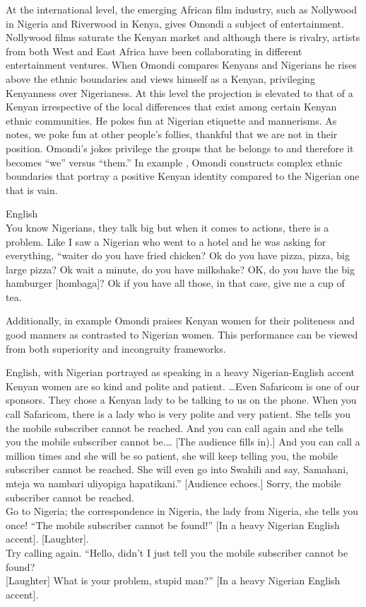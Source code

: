 \documentclass[output=paper]{langsci/langscibook}
\begin{document}
At the international level, the emerging African film industry, such as Nollywood in Nigeria and Riverwood in Kenya, gives Omondi a subject of entertainment. Nollywood films saturate the Kenyan market and although there is rivalry, artists from both West and East Africa have been collaborating in different entertainment ventures. When Omondi compares Kenyans and Nigerians he rises above the ethnic boundaries and views himself as a Kenyan, privileging Kenyanness over Nigerianess. At this level the projection is elevated to that of a Kenyan irrespective of the local differences that exist among certain Kenyan ethnic communities. He pokes fun at Nigerian etiquette and mannerisms. As \citet{Labrador2004} notes, we poke fun at other people’s follies, thankful that we are not in their position. Omondi’s jokes privilege the groups that he belongs to and therefore it becomes “we” versus “them.” In example , Omondi constructs complex ethnic boundaries that portray a positive Kenyan identity compared to the Nigerian one that is vain.

\ea\label{ex:muaka:4}
{English }\\
  You know Nigerians, they talk big but when it comes to actions, there is a problem. Like I saw a Nigerian who went to a hotel and he was asking for everything, “waiter do you have fried chicken? Ok do you have pizza, pizza, big large pizza? Ok wait a minute, do you have milkshake? OK, do you have the big hamburger \textup{[hombaga]}? Ok if you have all those, in that case, give me a cup of tea.   \citep{Omogi2012}
\z

Additionally, in example  Omondi praises Kenyan women for their politeness and good manners as contrasted to Nigerian women. This performance can be viewed from both superiority and incongruity frameworks.

\ea\label{ex:muaka:5}
{English, with Nigerian portrayed as speaking in a heavy Nigerian-English accent}\\
Kenyan women are so kind and polite and patient. …Even Safaricom is one of our sponsors. They chose a Kenyan lady to be talking to us on the phone. When you call Safaricom, there is a lady who is very polite and very patient. She tells you the mobile subscriber cannot be reached. And you can call again and she tells you the mobile subscriber cannot be.… \textup{[The audience fills in).]} And you can call a million times and she will be so patient, she will keep telling you, the mobile subscriber cannot be reached. She will even go into Swahili and say, Samahani, mteja wa nambari uliyopiga hapatikani.” \textup{[Audience echoes.]} Sorry, the mobile subscriber cannot be reached.\\
Go to Nigeria; the correspondence in Nigeria, the lady from Nigeria, she tells you 
once! “The mobile subscriber cannot be found!” \textup{ [In a heavy Nigerian English accent]. [Laughter].}\\
Try calling again. “Hello, didn’t I just tell you the mobile subscriber cannot be found? \\
\textup{[Laughter]} What is your problem, stupid man?” \textup{[In a heavy Nigerian English accent].} \citep{Omogi2012}
\z
\end{document}
